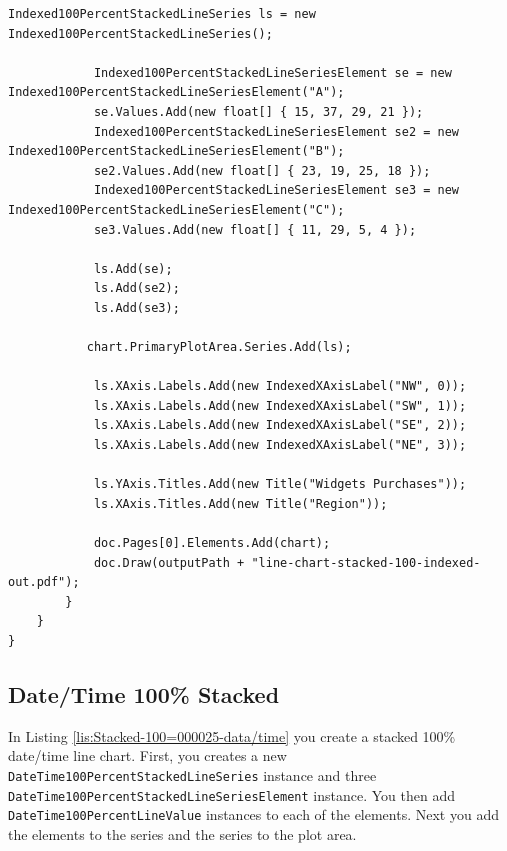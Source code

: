 \documentclass[american,letterpaper]{tufte-book}
\numberwithin{equation}{section}
\numberwithin{figure}{section}
\begin{document}
{\begin{lstlisting}[caption={Stacked 100\% indexed line chart.},label={lis:line-Stacked-100=000025-indexed},basicstyle={\small\ttfamily},breaklines=true]
            Indexed100PercentStackedLineSeries ls = new Indexed100PercentStackedLineSeries();

            Indexed100PercentStackedLineSeriesElement se = new Indexed100PercentStackedLineSeriesElement("A");
            se.Values.Add(new float[] { 15, 37, 29, 21 });
            Indexed100PercentStackedLineSeriesElement se2 = new Indexed100PercentStackedLineSeriesElement("B");
            se2.Values.Add(new float[] { 23, 19, 25, 18 });
            Indexed100PercentStackedLineSeriesElement se3 = new Indexed100PercentStackedLineSeriesElement("C");
            se3.Values.Add(new float[] { 11, 29, 5, 4 });

            ls.Add(se);
            ls.Add(se2);
            ls.Add(se3);
                        
           chart.PrimaryPlotArea.Series.Add(ls);

            ls.XAxis.Labels.Add(new IndexedXAxisLabel("NW", 0));
            ls.XAxis.Labels.Add(new IndexedXAxisLabel("SW", 1));
            ls.XAxis.Labels.Add(new IndexedXAxisLabel("SE", 2));
            ls.XAxis.Labels.Add(new IndexedXAxisLabel("NE", 3));

            ls.YAxis.Titles.Add(new Title("Widgets Purchases"));
            ls.XAxis.Titles.Add(new Title("Region"));

            doc.Pages[0].Elements.Add(chart);
            doc.Draw(outputPath + "line-chart-stacked-100-indexed-out.pdf");
        }
    }
}
\end{lstlisting}
\leavevmode\egroup

\subsection{Date/Time 100\% Stacked}

In Listing \ref{lis:Stacked-100=000025-data/time} you create a stacked
100\% date/time line chart. First, you creates a new \texttt{DateTime100PercentStackedLineSeries}
instance and three \texttt{DateTime100PercentStackedLineSeriesElement}
instance. You then add \texttt{DateTime100PercentLineValue} instances
to each of the elements. Next you add the elements to the series and
the series to the plot area.

}
\end{document}
